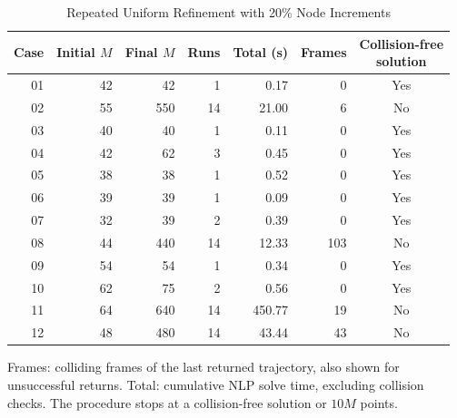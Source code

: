 \begin{table}[t]
\caption{Repeated Uniform Refinement with 20\% Node Increments}\label{tab:refinement}
\centering\footnotesize\setlength{\tabcolsep}{4.8pt}
\begin{tabular}{@{}rrrrrrc@{}}\toprule
Case&Initial $M$&Final $M$&Runs&Total (s)&Frames&\shortstack{Collision-free\\solution}\\\midrule
01&42&42&1&0.17&0&Yes\\
02&55&550&14&21.00&6&No\\
03&40&40&1&0.11&0&Yes\\
04&42&62&3&0.45&0&Yes\\
05&38&38&1&0.52&0&Yes\\
06&39&39&1&0.09&0&Yes\\
07&32&39&2&0.39&0&Yes\\
08&44&440&14&12.33&103&No\\
09&54&54&1&0.34&0&Yes\\
10&62&75&2&0.56&0&Yes\\
11&64&640&14&450.77&19&No\\
12&48&480&14&43.44&43&No\\
\bottomrule\end{tabular}
\par\smallskip\parbox{\columnwidth}{\footnotesize Frames: colliding frames of the last returned trajectory, also shown for unsuccessful returns. Total: cumulative NLP solve time, excluding collision checks. The procedure stops at a collision-free solution or $10M$ points.}
\end{table}